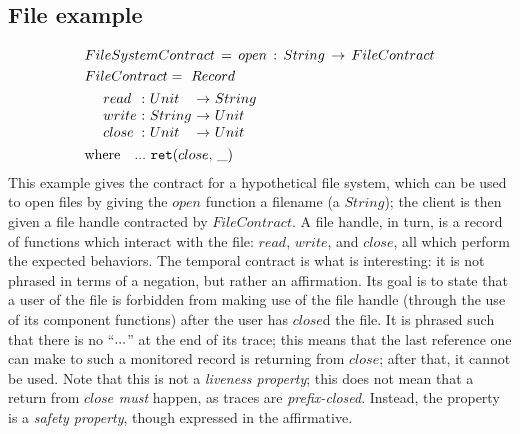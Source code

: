 {\subsection{File example} \label{sec:file}
%
\begin{align*}
 &FileSystemContract\, =\, open\, :\, String\, \to\, FileContract \\
 &FileContract =~ Record \\
 &\begin{array}{ @{\quad~}l@{\ :} @{~}l@{\ \to\ } l }
  read & Unit & String \\
  write & String & Unit \\
  close & Unit & Unit
 \end{array} \\
 &\text{where}\quad \sddd~ \ret{close}
\end{align*}
%
This example gives the contract for a hypothetical file system, which can be used to open files by giving the $open$ function a filename (a $String$); the client is then given a file handle contracted by $FileContract$.
%
A file handle, in turn, is a record of functions which interact with the file: $read$, $write$, and $close$, all which perform the expected behaviors.
%
The temporal contract is what is interesting: it is not phrased in terms of a negation, but rather an affirmation.
%
Its goal is to state that a user of the file is forbidden from making use of the file handle (through the use of its component functions) after the user has $close$d the file.
%
It is phrased such that there is no ``${\tt ...}$'' at the end of its trace; this means that the last reference one can make to such a monitored record is returning from $close$; after that, it cannot be used.
%
Note that this is not a \emph{liveness property}; this does not mean that a return from $close$ \emph{must} happen, as traces are \emph{prefix-closed}.
%
Instead, the property is a \emph{safety property}, though expressed in the affirmative.
%
}
